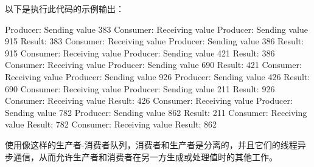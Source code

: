 以下是执行此代码的示例输出：

\begin{shell}
Producer: Sending value 383
Consumer: Receiving value
Producer: Sending value 915
Result: 383
Consumer: Receiving value
Producer: Sending value 386
Result: 915
Consumer: Receiving value
Producer: Sending value 421
Result: 386
Consumer: Receiving value
Producer: Sending value 690
Result: 421
Consumer: Receiving value
Producer: Sending value 926
Producer: Sending value 426
Result: 690
Consumer: Receiving value
Producer: Sending value 211
Result: 926
Consumer: Receiving value
Result: 426
Consumer: Receiving value
Producer: Sending value 782
Producer: Sending value 862
Result: 211
Consumer: Receiving value
Result: 782
Consumer: Receiving value
Result: 862
\end{shell}

使用像这样的生产者-消费者队列，消费者和生产者是分离的，并且它们的线程异步通信，从而允许生产者和消费者在另一方生成或处理值时的其他工作。


